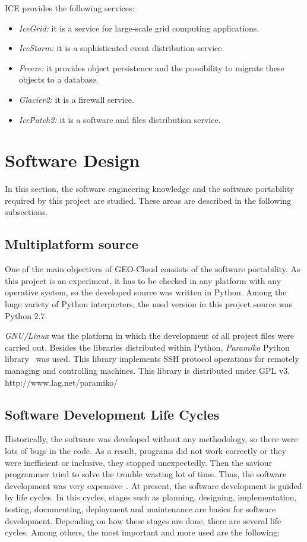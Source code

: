 \ac{ICE} provides the following services:
\begin{itemize}
\item \emph{IceGrid:} it is a service for large-scale grid computing applications.
\item \emph{IceStorm:} it is a sophisticated event distribution service.
\item \emph{Freeze:} it provides object persistence and the possibility to migrate
  these objects to a database.
\item \emph{Glacier2:} it is a firewall service.
\item \emph{IcePatch2:} it is a software and files distribution service.
\end{itemize}

\section{Software Design}

In this section, the software engineering knowledge and the software portability required by this project are studied. These areas are
described in the following subsections.

\subsection{Multiplatform source}

One of the main objectives of GEO-Cloud consists of the software portability. As
this project is an experiment, it has to be checked in any platform with any
operative system, so the developed source was written in Python. Among the huge variety of Python
interpreters, the used version in this project source was Python 2.7.

\emph{GNU/Linux} was the platform in which the development of all project files were
carried out. Besides the libraries distributed within Python, \emph{Paramiko}
Python library~\cite{Team2013} was used. This library implements \ac{SSH} protocol operations
for remotely managing and controlling machines. This library is distributed
under \ac{GPL} v3.
http://www.lag.net/paramiko/

\subsection{Software Development Life Cycles}

Historically, the software
was developed without any methodology, so there were lots of bugs in the
code. As a result, programs did not work correctly or they were inefficient or
inclusive, they stopped unexpectedly. Then the saviour programmer tried to solve
the trouble wasting lot of time. Thus, the software development was very
expensive~\cite{Garcia2013}.
At present, the software development is guided by life cycles. In this cycles,
stages such as planning, designing, implementation, testing, documenting, deployment
and maintenance are basics for software development. Depending on how these
stages are done, there are several life cycles. Among others, the most important and
more used are the following:


